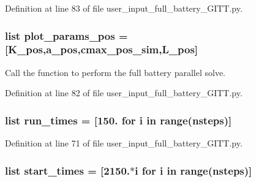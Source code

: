 Definition at line 83 of file user\-\_\-input\-\_\-full\-\_\-battery\-\_\-\-G\-I\-T\-T.\-py.

\hypertarget{namespaceuser__input__full__battery___g_i_t_t_a5bacef25baf63731923fbef674af4e9d}{
\subsubsection[{plot\-\_\-params\-\_\-pos}]{\setlength{\rightskip}{0pt plus 5cm}list plot\-\_\-params\-\_\-pos = \mbox{[}{\bf K\-\_\-pos},a\-\_\-pos,{\bf cmax\-\_\-pos\-\_\-sim},L\-\_\-pos\mbox{]}}}\label{namespaceuser__input__full__battery___g_i_t_t_a5bacef25baf63731923fbef674af4e9d}


Call the function to perform the full battery parallel solve. 



Definition at line 82 of file user\-\_\-input\-\_\-full\-\_\-battery\-\_\-\-G\-I\-T\-T.\-py.

\hypertarget{namespaceuser__input__full__battery___g_i_t_t_a5a6deb885420d2b81e210e580767b1c1}{
\subsubsection[{run\-\_\-times}]{\setlength{\rightskip}{0pt plus 5cm}list run\-\_\-times = \mbox{[}150. for i in range({\bf nsteps})\mbox{]}}}\label{namespaceuser__input__full__battery___g_i_t_t_a5a6deb885420d2b81e210e580767b1c1}


Definition at line 71 of file user\-\_\-input\-\_\-full\-\_\-battery\-\_\-\-G\-I\-T\-T.\-py.

\hypertarget{namespaceuser__input__full__battery___g_i_t_t_a377a515511d37e8c7ac5501847d6485d}{
\subsubsection[{start\-\_\-times}]{\setlength{\rightskip}{0pt plus 5cm}list start\-\_\-times = \mbox{[}2150.$\ast$i for i in range({\bf nsteps})\mbox{]}}}\label{namespaceuser__input__full__battery___g_i_t_t_a377a515511d37e8c7ac5501847d6485d}


